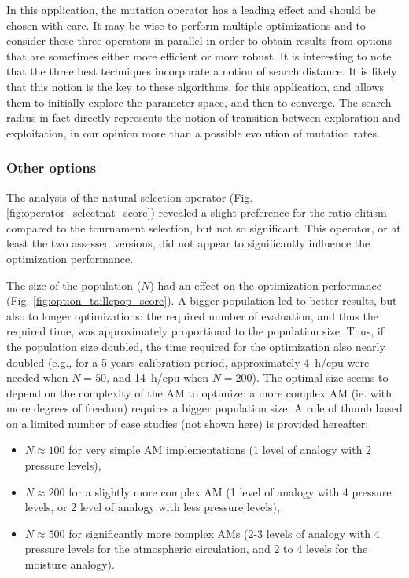 \documentclass{ametsoc}
\begin{document}
In this application, the mutation operator has a leading effect and should be chosen with care. It may be wise to perform multiple optimizations and to consider these three operators in parallel in order to obtain results from options that are sometimes either more efficient or more robust. It is interesting to note that the three best techniques incorporate a notion of search distance. It is likely that this notion is the key to these algorithms, for this application, and allows them to initially explore the parameter space, and then to converge. The search radius in fact directly represents the notion of transition between exploration and exploitation, in our opinion more than a possible evolution of mutation rates.


\subsubsection{Other options}

The analysis of the natural selection operator (Fig. \ref{fig:operator_selectnat_score}) revealed a slight preference for the ratio-elitism compared to the tournament selection, but not so significant. This operator, or at least the two assessed versions, did not appear to significantly influence the optimization performance.

The size of the population ($N$) had an effect on the optimization performance (Fig. \ref{fig:option_taillepop_score}). A bigger population led to better results, but also to longer optimizations: the required number of evaluation, and thus the required time, was approximately proportional to the population size. Thus, if the population size doubled, the time required for the optimization also nearly doubled (e.g., for a 5 years calibration period, approximately 4~h/cpu were needed when $N = 50$, and 14~h/cpu when $N = 200$). The optimal size seems to depend on the complexity of the AM to optimize: a more complex AM (ie. with more degrees of freedom) requires a bigger population size. A rule of thumb based on a limited number of case studies (not shown here) is provided hereafter:

\begin{itemize}
	\item $N\approx100$ for very simple AM implementations (1 level of analogy with 2 pressure levels),
	\item $N\approx200$ for a slightly more complex AM (1 level of analogy with 4 pressure levels, or 2 level of analogy with less pressure levels),
	\item $N\approx500$ for significantly more complex AMs (2-3 levels of analogy with 4 pressure levels for the atmospheric circulation, and 2 to 4 levels for the moisture analogy).
\end{itemize}
\end{document}
